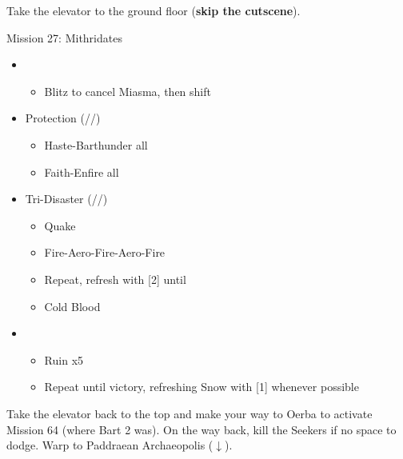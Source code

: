 \renewcommand{\fifth}{[5] Protection (\syn/\sen/\med)}
\renewcommand{\sixth}{[6] Tri-Disaster (\rav/\rav/\rav)}

Take the elevator to the ground floor (\textbf{skip the cutscene}).

\begin{battle}{Mission 27: Mithridates}
	\begin{itemize}
		\item \fourth
			\begin{itemize}
				\item Blitz to cancel Miasma, then shift
			\end{itemize}
		\item \fifth
			\begin{itemize}
				\item Haste-Barthunder all
				\item Faith-Enfire all
			\end{itemize}
		\item \sixth
			\begin{itemize}
				\item Quake
				\item Fire-Aero-Fire-Aero-Fire
				\item Repeat, refresh with [2] until \stagger
				\item Cold Blood
			\end{itemize}
		\item \third
			\begin{itemize}
				\item Ruin x5
				\item Repeat until victory, refreshing Snow with [1] whenever possible
			\end{itemize}
	\end{itemize}
\end{battle}

Take the elevator back to the top and make your way to Oerba to activate Mission 64 (where Bart 2 was).
On the way back, kill the Seekers if no space to dodge.
Warp to Paddraean Archaeopolis ($\downarrow$).

